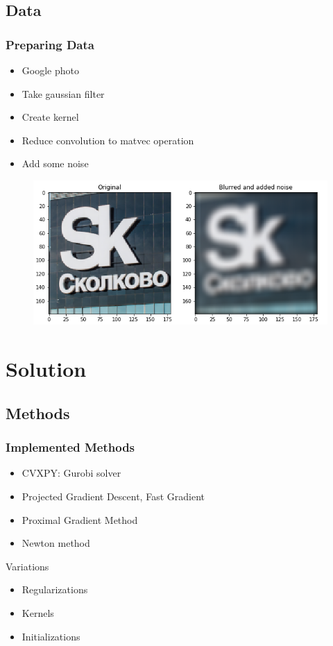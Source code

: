 \documentclass[hyperref={pdfpagelabels=false}]{beamer}
\begin{document}
\subsection{Data}
\begin{frame}
\frametitle{Preparing Data}

\begin{itemize}
\item Google photo
\item Take gaussian filter
\item Create kernel
\item Reduce convolution to matvec operation
\item Add some noise
\end{itemize}

\begin{center}
\begin{figure}[h]
\includegraphics[scale=0.53]{filter.png}
\end{figure}
\end{center}

\end{frame}
\section{Solution} 
\subsection{Methods}
\begin{frame}
\frametitle{Implemented Methods}

\begin{itemize}
\item CVXPY: Gurobi solver
\item Projected Gradient Descent, Fast Gradient
\item Proximal Gradient Method
\item Newton method

\end{itemize}

\begin{block}{Variations}
\begin{itemize}
\item Regularizations
\item Kernels
\item Initializations
\end{itemize}
\end{block}
\end{frame}
\end{document}
